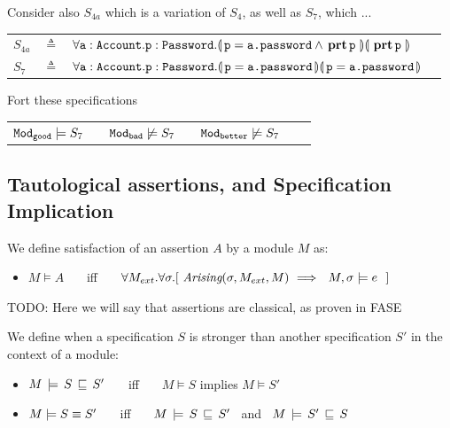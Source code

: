 \vspace{.6cm}
Consider also  $S_{4a}$ which is a variation of $S_4$, as well as $S_7$, which ...

\begin{tabular}{lcll}
$S_{4a}$   &     $\triangleq$   &   ${\forall {{\texttt{a}}:{\texttt{Account}}.{\texttt{p}}:{\texttt{Password}}}.{\llparenthesis}\, {\texttt{p}}={\texttt{a.password}} \wedge {\ensuremath{\, \mathbf{prt}}\, {\texttt{p}}\, } \,{\rrparenthesis}{\llparenthesis}\, {\, \mathbf{prt}\, {\texttt{p}}\, } \,{\rrparenthesis} }$
 \\
$S_7$ & $\triangleq$   & ${\forall {{\texttt{a}}:{\texttt{Account}}.{\texttt{p}}:{\texttt{Password}}}.{\llparenthesis}\, {\texttt{p}}={\texttt{a.password}} \,{\rrparenthesis}{\llparenthesis}\, {\texttt{p}}={\texttt{a.password}} \,{\rrparenthesis} }$
 \end{tabular}
 
 \noindent
 Fort these specifications
 
 \begin{tabular}{lllllll}
${\texttt{Mod}}_{{\texttt{good}}}  \models S_7$  & & ${\texttt{Mod}}_{{\texttt{bad}}} \not\models S_7$ &&  ${\texttt{Mod}}_{{\texttt{better}}} \not\models S_7$ \\
\end{tabular}

\subsection{Tautological assertions, and Specification Implication}

\begin{definition} 
\label{def:assertion-inference-semantics}
We define satisfaction of an assertion $A$ by a  module $M$ as:
\begin{itemize}
\item
$M \vDash A$   \ \ \ iff \ \ \  $\forall M_{ext}. \forall \sigma.[\ \arising{\sigma}{M_{ext}}{M} \ \Longrightarrow \ \ \satisfiesA{M}{\sigma}{e}\ \ ]$
\end{itemize}
\end{definition}

TODO: Here we will say that assertions are classical, as proven in FASE

\begin{definition} 
\label{def:specification-implication-semantics}
We define when a specification $S$ is stronger than another specification $S'$  in the context of a  module: 
 \begin{itemize}[itemsep=5pt]
\item 
$M\, \models\, S\, \sqsubseteq\, S'$   \ \ \ iff \ \ \  $M\models S$ implies $M \models S'$
\item
$M \models S  \equiv  S'$   \ \ \ iff \ \ \ $M\, \models\, S\, \sqsubseteq\, S'$  \ and \  $M\, \models\, S'\, \sqsubseteq\, S$    
\end{itemize}
\end{definition}

